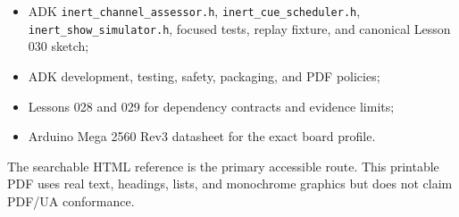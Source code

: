 \documentclass[11pt]{article}
\begin{document}
\begin{itemize}
  \item ADK \texttt{inert\_channel\_assessor.h},
        \texttt{inert\_cue\_scheduler.h},
        \texttt{inert\_show\_simulator.h}, focused tests, replay fixture, and
        canonical Lesson 030 sketch;
  \item ADK development, testing, safety, packaging, and PDF policies;
  \item Lessons 028 and 029 for dependency contracts and evidence limits;
  \item Arduino Mega 2560 Rev3 datasheet for the exact board profile.
\end{itemize}

The searchable HTML reference is the primary accessible route. This printable
PDF uses real text, headings, lists, and monochrome graphics but does not claim
PDF/UA conformance.
\end{document}
